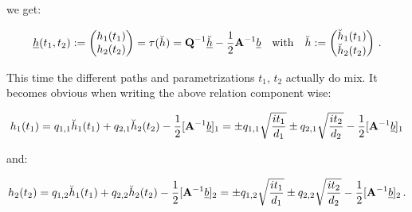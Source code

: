 \documentclass[a4paper,10pt]{article}
\begin{document}
we get:

\begin{equation}
 \underline{h}(t_1, t_2) :=
 \begin{pmatrix}
  h_1(t_1) \\ h_2(t_2)
 \end{pmatrix}
 = \tau(\breve{h})
 = \mathbf{Q}{}^{-1} \breve{\underline{h}} - \frac{1}{2}\mathbf{A}{}^{-1} \underline{b}
 \quad \mathrm{with} \quad
 \breve{h} :=
 \begin{pmatrix}
  \breve{h}_1(t_1) \\ \breve{h}_2(t_2)
 \end{pmatrix} \,.
\end{equation}

This time the different paths and parametrizations $t_1$, $t_2$
actually do mix. It becomes obvious when writing the above
relation component wise:

\begin{equation}
 h_1(t_1) = q_{1,1} \breve{h}_1(t_1) + q_{2,1} \breve{h}_2(t_2) - \frac{1}{2} [\mathbf{A}{}^{-1} \underline{b}]_1
          = \pm q_{1,1} \sqrt{\frac{i t_1}{d_{1}}}
            \pm q_{2,1} \sqrt{\frac{i t_2}{d_{2}}}
            - \frac{1}{2} [\mathbf{A}{}^{-1} \underline{b}]_1
\end{equation}

and:

\begin{equation}
 h_2(t_2) = q_{1,2} \breve{h}_1(t_1) + q_{2,2} \breve{h}_2(t_2) - \frac{1}{2} [\mathbf{A}{}^{-1} \underline{b}]_2
          = \pm q_{1,2} \sqrt{\frac{i t_1}{d_{1}}}
            \pm q_{2,2} \sqrt{\frac{i t_2}{d_{2}}}
            - \frac{1}{2} [\mathbf{A}{}^{-1} \underline{b}]_2 \,.
\end{equation}

%
%
%
%
\end{document}
